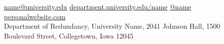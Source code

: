 

\noindent\href{mailto:name@university.edu}{name@university.edu}\bull %
\href{http://department.university.edu/name}{department.university.edu/name}\bull %
\href{https://twitter.com/name}{@name}\bull %
\href{http://www.personalwebsite.com}{personalwebsite.com}\\
Department of Redundancy, University Name, 2041 Johnson Hall, 1500
Boulevard Street, Collegetown, Iowa 12045


\spacedhrule{0.9em}{-0.4em} %
